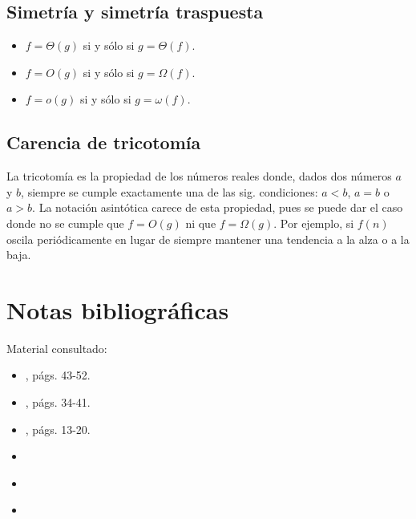 \subsection{Simetría y simetría traspuesta}

\begin{itemize}
    \item $f=\Theta(g)$ si y sólo si $g=\Theta(f)$.
    \item $f=O(g)$ si y sólo si $g=\Omega(f)$.
    \item $f=o(g)$ si y sólo si $g=\omega(f)$.
\end{itemize}

\subsection{Carencia de tricotomía}

La tricotomía es la propiedad de los números reales donde, dados dos
números $a$ y $b$, siempre se cumple exactamente una de las sig.
condiciones: $a<b$, $a=b$ o $a>b$. La notación asintótica carece
de esta propiedad, pues se puede dar el caso donde no se cumple
que $f=O(g)$ ni que $f=\Omega(g)$. Por ejemplo, si $f(n)$ oscila
periódicamente en lugar de siempre mantener una tendencia a la alza
o a la baja.

\section*{Notas bibliográficas}

Material consultado:
\begin{itemize}
    \item \textcite{cormen_introduction_2009}, págs. 43-52.
    \item \textcite{skiena_algorithm_2011}, págs. 34-41.
    \item \textcite{goodrich_algorithm_2001}, págs. 13-20.
    \item \textcite{baker_2013}
    \item \textcite{leighton_and_rubinfeld_2004}
    \item \textcite{tomescu_2014}
\end{itemize}
